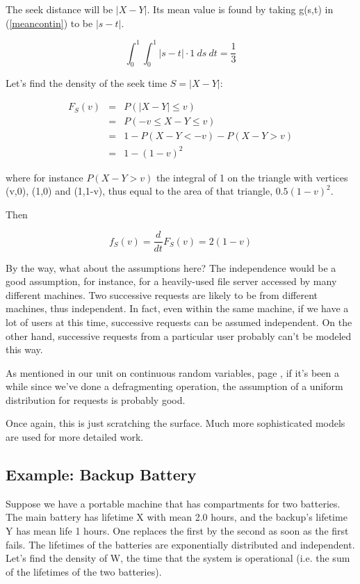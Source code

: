 The seek distance will be $|X-Y|$.  Its mean value is found by taking
g(s,t) in (\ref{meancontin}) to be $|s-t|$.

\begin{equation}
\int_{0}^{1} \int_{0}^{1} |s-t| \cdot 1 ~ ds ~ dt = \frac{1}{3}
\end{equation}

Let's find the density of the seek time $S = |X-Y|$:

\begin{eqnarray}
F_S(v) &=& P(|X-Y| \leq v) \\
&=& P(-v \leq X-Y \leq v) \\ 
&=& 1 - P(X-Y < -v) - P(X-Y > v) \\
&=& 1 - (1-v)^2
\end{eqnarray}

where for instance $P(X - Y > v)$ the integral of 1 on the triangle with
vertices (v,0), (1,0) and (1,1-v), thus equal to the area of that
triangle, $0.5 (1-v)^2$.

Then

\begin{equation}
f_S(v) = \frac{d}{dt} F_S(v) = 2(1-v)
\end{equation}

By the way, what about the assumptions here?  The independence would be
a good assumption, for instance, for a heavily-used file server accessed
by many different machines.  Two successive requests are likely to be
from different machines, thus independent.  In fact, even within the
same machine, if we have a lot of users at this time, successive
requests can be assumed independent.  On the other hand, successive
requests from a particular user probably can't be modeled this way.

As mentioned in our unit on continuous random variables, page
\pageref{defrag}, if it's been a while since we've done a defragmenting
operation, the assumption of a uniform distribution for requests is
probably good.

Once again, this is just scratching the surface.  Much more
sophisticated models are used for more detailed work.

\subsection{Example:  Backup Battery}
\label{backup}

Suppose we have a portable machine that has compartments for two
batteries. The main battery has lifetime X with mean 2.0 hours, and the
backup's lifetime Y has mean life 1 hours. One replaces the first by
the second as soon as the first fails. The lifetimes of the batteries
are exponentially distributed and independent. Let's find the density of
W, the time that the system is operational (i.e. the sum of the
lifetimes of the two batteries).


